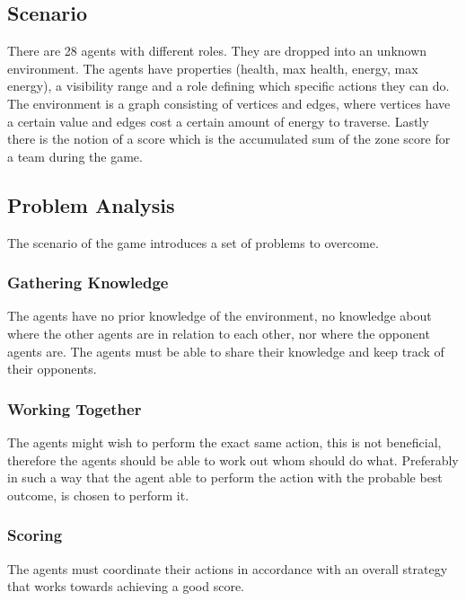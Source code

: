 \documentclass[11pt]{article}
\begin{document}
\subsection{Scenario}
There are 28 agents with different roles. They are dropped into an unknown environment. The agents have properties (health, max health, energy, max energy), a visibility range and a role defining which specific actions they can do. The environment is a graph consisting of vertices and edges, where vertices have a certain value and edges cost a certain amount of energy to traverse. Lastly there is the notion of a score which is the accumulated sum of the zone score for a team during the game.
 
\subsection{Problem Analysis}
The scenario of the game introduces a set of problems to overcome.

\subsubsection{Gathering Knowledge}
The agents have no prior knowledge of the environment, no knowledge about where the other agents are in relation to each other, nor where the opponent agents are. The agents must be able to share their knowledge and keep track of their opponents.
 
\subsubsection{Working Together}
The agents might wish to perform the exact same action, this is not beneficial, therefore the agents should be able to work out whom should do what. Preferably in such a way that the agent able to perform the action with the probable best outcome, is chosen to perform it. 

\subsubsection{Scoring}
The agents must coordinate their actions in accordance with an overall strategy that works towards achieving a good score.
\end{document}
